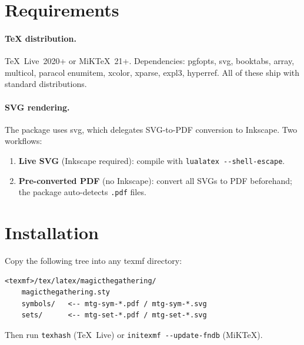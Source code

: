 \documentclass[a4paper,11pt]{article}
\newcommand{\pkg}[1]{\textsf{#1}}
\newcommand{\file}[1]{\texttt{#1}}
\begin{document}
\section{Requirements}

\paragraph{TeX distribution.}
TeX~Live~2020+ or MiK\TeX~21+.
Dependencies: \pkg{pgfopts}, \pkg{svg}, \pkg{booktabs}, \pkg{array},
\pkg{multicol}, \pkg{paracol} \pkg{enumitem}, \pkg{xcolor}, \pkg{xparse},
\pkg{expl3}, \pkg{hyperref}.
All of these ship with standard distributions.

\paragraph{SVG rendering.}
The package uses \pkg{svg}, which delegates SVG-to-PDF conversion to Inkscape.  Two workflows:
\begin{enumerate}[itemsep=2pt]
  \item \textbf{Live SVG} (Inkscape required):
        compile with \texttt{lualatex -{}-shell-escape}.
  \item \textbf{Pre-converted PDF} (no Inkscape):
        convert all SVGs to PDF beforehand;
        the package auto-detects \file{.pdf} files.
\end{enumerate}

\section{Installation}

Copy the following tree into any texmf directory:

\begin{lstlisting}[language={},basicstyle=\ttfamily\small]
<texmf>/tex/latex/magicthegathering/
    magicthegathering.sty
    symbols/   <-- mtg-sym-*.pdf / mtg-sym-*.svg
    sets/      <-- mtg-set-*.pdf / mtg-set-*.svg
\end{lstlisting}

Then run \texttt{texhash} (TeX~Live) or
\texttt{initexmf -{}-update-fndb} (MiK\TeX).

\end{document}
